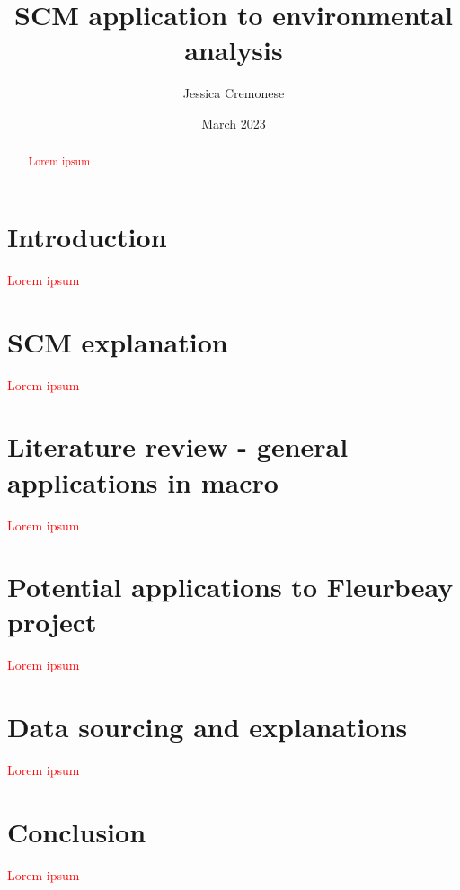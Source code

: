\documentclass[12pt,a4paper,draft]{article}
\begin{document}
\begin{titlepage}
\title{SCM application to environmental analysis}
\author{Jessica Cremonese}
\date{March 2023}
\maketitle
\end{titlepage}

\tableofcontents

\newpage
\begin{abstract}
    \textcolor{red}{Lorem ipsum}
\end{abstract}
\newpage


\section{Introduction}
\textcolor{red}{Lorem ipsum}

\section{SCM explanation}
\textcolor{red}{Lorem ipsum}

\section{Literature review - general applications in macro}
\textcolor{red}{Lorem ipsum}

\section{Potential applications to Fleurbeay project}
\textcolor{red}{Lorem ipsum}

\section{Data sourcing and explanations}
\textcolor{red}{Lorem ipsum}

\section{Conclusion}
\textcolor{red}{Lorem ipsum}
\end{document}
